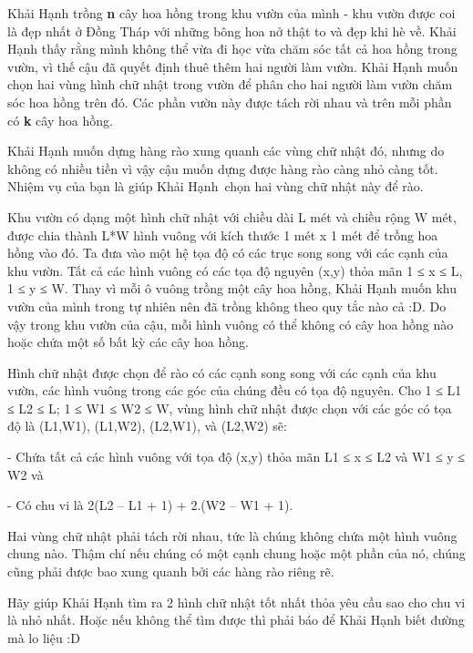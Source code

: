 Khải Hạnh trồng \textbf{ n } cây hoa hồng trong khu vườn của mình - khu vườn được coi là đẹp nhất ở Đồng Tháp với những bông hoa nở thật to và đẹp khi hè về. Khải Hạnh thấy rằng mình không thể vừa đi học vừa chăm sóc tất cả hoa hồng trong vườn, vì thế cậu đã quyết định thuê thêm hai người làm vườn. Khải Hạnh muốn chọn hai vùng hình chữ nhật trong vườn để phân cho hai người làm vườn chăm sóc hoa hồng trên đó. Các phần vườn này được tách rời nhau và trên mỗi phần có \textbf{ k } cây hoa hồng.





Khải Hạnh muốn dựng hàng rào xung quanh các vùng chữ nhật đó, nhưng do không có nhiều tiền vì vậy cậu muốn dựng được hàng rào càng nhỏ càng tốt. Nhiệm vụ của bạn là giúp Khải Hạnh chọn hai vùng chữ nhật này để rào.


Khu vườn có dạng một hình chữ nhật với chiều dài L mét và chiều rộng W mét, được chia thành L*W hình vuông với kích thước 1 mét x 1 mét để trồng hoa hồng vào đó. Ta đưa vào một hệ tọa độ có các trục song song với các cạnh của khu vườn. Tất cả các hình vuông có các tọa độ nguyên (x,y) thỏa mãn 1 ≤ x ≤ L, 1 ≤ y ≤ W. Thay vì mỗi ô vuông trồng một cây hoa hồng, Khải Hạnh muốn khu vườn của mình trong tự nhiên nên đã trồng không theo quy tắc nào cả :D. Do vậy trong khu vườn của cậu, mỗi hình vuông có thể không có cây hoa hồng nào hoặc chứa một số bất kỳ các cây hoa hồng.


Hình chữ nhật được chọn để rào có các cạnh song song với các cạnh của khu vườn, các hình vuông trong các góc của chúng đều có tọa độ nguyên. Cho 1 ≤ L1 ≤ L2 ≤ L; 1 ≤ W1 ≤ W2 ≤ W, vùng hình chữ nhật được chọn với các góc có tọa độ là (L1,W1), (L1,W2), (L2,W1), và (L2,W2) sẽ:


- Chứa tất cả các hình vuông với tọa độ (x,y) thỏa mãn L1 ≤ x ≤ L2 và W1 ≤ y ≤ W2 và


- Có chu vi là 2(L2 – L1 + 1) + 2.(W2 – W1 + 1).


Hai vùng chữ nhật phải tách rời nhau, tức là chúng không chứa một hình vuông chung nào. Thậm chí nếu chúng có một cạnh chung hoặc một phần của nó, chúng cũng phải được bao xung quanh bởi các hàng rào riêng rẽ.





Hãy giúp Khải Hạnh tìm ra 2 hình chữ nhật tốt nhất thỏa yêu cầu sao cho chu vi là nhỏ nhất. Hoặc nếu không thể tìm được thì phải báo để Khải Hạnh biết đường mà lo liệu :D